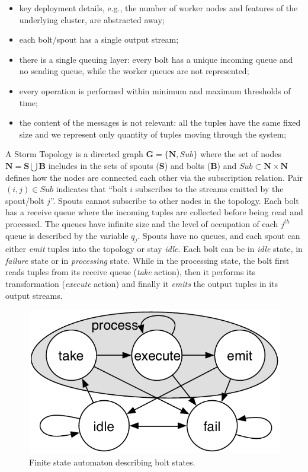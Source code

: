 \documentclass[smallextended]{svjour3}       %
\begin{document}
\begin{itemize}
	\item key deployment details, e.g., the number of worker nodes and features of the underlying cluster, are abstracted away;
	\item each bolt/spout has a single output stream;
	\item %
	there is a single queuing layer: every bolt has a unique incoming queue and no sending queue, while the worker queues are not represented;
	\item every operation is performed within minimum and maximum thresholds of time;
	\item %
	the content of the messages is not relevant: all the tuples have the same fixed size and we represent only quantity of tuples moving through the system;
\end{itemize}

A Storm Topology is a directed graph $\mathbf{G} = \{ \mathbf{N}, Sub\}$ where the set of nodes $\mathbf{N} = \mathbf{S}\bigcup \mathbf{B}$ includes in the sets of spouts (\textbf{S}) and bolts (\textbf{B}) and %
$Sub\subset\mathbf{N}\times\mathbf{N}$ defines how the nodes are connected each other via the subscription relation. Pair $(i,j)\in Sub$ indicates that ``bolt $i$ subscribes to the streams emitted by the spout/bolt $j$''. 
Spouts cannot subscribe to other nodes in the topology.
Each bolt has a receive queue where the incoming tuples are collected before being read and processed. %
The queues have infinite size and the level of occupation of each $j^{th}$ queue is described by the variable $q_j$. %
Spouts have no queues, and 
each spout can either \textit{emit} tuples into the topology or stay \emph{idle}.
Each bolt can be in \emph{idle} state, in \emph{failure} state or in  \emph{processing} state.  While in the processing state, the bolt first reads tuples from its receive queue (\textit{take} action), then it performs its transformation (\textit{execute} action) and finally it \textit{emits} the output tuples in its output streams. \\
\begin{figure}[tb]
\centering
\includegraphics[width=0.5\linewidth,draft]{fig6}
\caption{Finite state automaton describing bolt states.}
\label{figure-fsa}
\end{figure}
\end{document}
